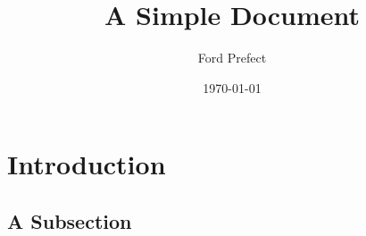 \documentclass[12pt,letterpaper]{article}
\author{Ford Prefect}
\date{\today}
\title{A Simple Document}
\begin{document}
\maketitle

\section{Introduction}
\label{sec:org977688c}

\lipsum[1]

\subsection{A Subsection}
\label{sec:org2a37287}

\lipsum[1-2]
\end{document}
